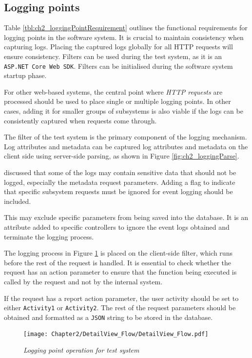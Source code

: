 \subsection{Logging points}
Table \ref{tbl:ch2_loggingPointRequirement} outlines the functional requirements for logging points in the software system. It is crucial to maintain consistency when capturing logs. Placing the captured logs globally for all HTTP requests will ensure consistency. Filters can be used during the test system, as it is an \texttt{ ASP.NET Core Web SDK}. Filters can be initialised during the software system startup phase.\par For other web-based systems, the central point where \textit{HTTP requests} are processed should be used to place single or multiple logging points. In other cases, adding it for smaller groups of subsystems is also viable if the logs can be consistently captured when requests come through. \par The filter of the test system is the primary component of the logging mechanism. Log attributes and metadata can be captured log attributes and metadata on the client side using server-side parsing, as shown in Figure \ref{fig:ch2_loggingParse}. \par {} discussed that some of the logs may contain sensitive data that should not be logged, especially the metadata request parameters. Adding a flag to indicate that specific subsystem requests must be ignored for event logging should be included. \par This may exclude specific parameters from being saved into the database. It is an attribute added to specific controllers to ignore the event logs obtained and terminate the logging process. \par The logging process in Figure \ref{fig:ch3_loggingProcess} is placed on the client-side filter, which runs before the rest of the request is handled. It is essential to check whether the request has an action parameter to ensure that the function being executed is called by the request and not by the internal system. \par If the request has a report action parameter, the user activity should be set to either \texttt{Activity1} or \texttt{Activity2}. The rest of the request parameters should be obtained and formatted as a \texttt{JSON} string to be stored in the database.

\clearpage

\begin{figure}[!htb]
	\centering %
	\texttt{[image: Chapter2/DetailView\_Flow/DetailView\_Flow.pdf]}
	\caption[Logging point operation for test system]
	{\textit{Logging point operation for test system}}\label{fig:ch3_loggingProcess}
\end{figure}

